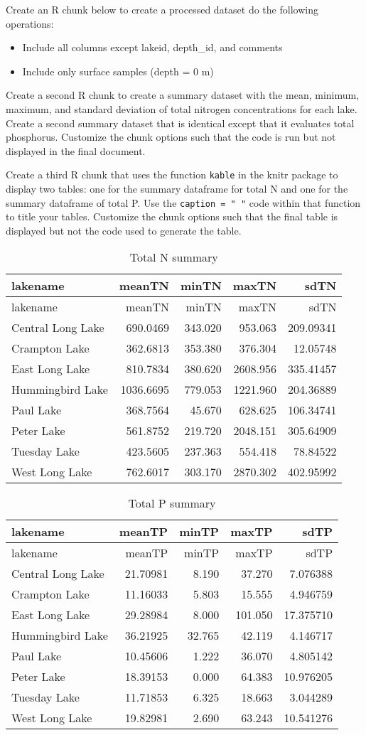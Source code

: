 \documentclass[]{article}
\providecommand{\tightlist}{%
  \setlength{\itemsep}{0pt}\setlength{\parskip}{0pt}}
\begin{document}
Create an R chunk below to create a processed dataset do the following
operations:

\begin{itemize}
\tightlist
\item
  Include all columns except lakeid, depth\_id, and comments
\item
  Include only surface samples (depth = 0 m)
\end{itemize}

Create a second R chunk to create a summary dataset with the mean,
minimum, maximum, and standard deviation of total nitrogen
concentrations for each lake. Create a second summary dataset that is
identical except that it evaluates total phosphorus. Customize the chunk
options such that the code is run but not displayed in the final
document.

Create a third R chunk that uses the function \texttt{kable} in the
knitr package to display two tables: one for the summary dataframe for
total N and one for the summary dataframe of total P. Use the
\texttt{caption\ =\ "\ "} code within that function to title your
tables. Customize the chunk options such that the final table is
displayed but not the code used to generate the table.

\begin{longtable}[]{@{}lrrrr@{}}
\caption{Total N summary}\tabularnewline
\toprule
lakename & meanTN & minTN & maxTN & sdTN\tabularnewline
\midrule
\endfirsthead
\toprule
lakename & meanTN & minTN & maxTN & sdTN\tabularnewline
\midrule
\endhead
Central Long Lake & 690.0469 & 343.020 & 953.063 &
209.09341\tabularnewline
Crampton Lake & 362.6813 & 353.380 & 376.304 & 12.05748\tabularnewline
East Long Lake & 810.7834 & 380.620 & 2608.956 &
335.41457\tabularnewline
Hummingbird Lake & 1036.6695 & 779.053 & 1221.960 &
204.36889\tabularnewline
Paul Lake & 368.7564 & 45.670 & 628.625 & 106.34741\tabularnewline
Peter Lake & 561.8752 & 219.720 & 2048.151 & 305.64909\tabularnewline
Tuesday Lake & 423.5605 & 237.363 & 554.418 & 78.84522\tabularnewline
West Long Lake & 762.6017 & 303.170 & 2870.302 &
402.95992\tabularnewline
\bottomrule
\end{longtable}

\begin{longtable}[]{@{}lrrrr@{}}
\caption{Total P summary}\tabularnewline
\toprule
lakename & meanTP & minTP & maxTP & sdTP\tabularnewline
\midrule
\endfirsthead
\toprule
lakename & meanTP & minTP & maxTP & sdTP\tabularnewline
\midrule
\endhead
Central Long Lake & 21.70981 & 8.190 & 37.270 & 7.076388\tabularnewline
Crampton Lake & 11.16033 & 5.803 & 15.555 & 4.946759\tabularnewline
East Long Lake & 29.28984 & 8.000 & 101.050 & 17.375710\tabularnewline
Hummingbird Lake & 36.21925 & 32.765 & 42.119 & 4.146717\tabularnewline
Paul Lake & 10.45606 & 1.222 & 36.070 & 4.805142\tabularnewline
Peter Lake & 18.39153 & 0.000 & 64.383 & 10.976205\tabularnewline
Tuesday Lake & 11.71853 & 6.325 & 18.663 & 3.044289\tabularnewline
West Long Lake & 19.82981 & 2.690 & 63.243 & 10.541276\tabularnewline
\bottomrule
\end{longtable}
\end{document}

